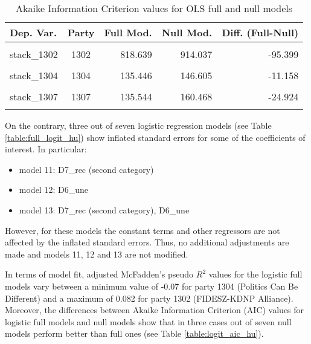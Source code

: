 \documentclass[
]{article}
\providecommand{\tightlist}{%
  \setlength{\itemsep}{0pt}\setlength{\parskip}{0pt}}
\begin{document}
\begin{table}[!h]

\caption{\label{tab:unnamed-chunk-85}Akaike Information Criterion values for OLS full and null models 
        \label{table:ols_aic_hu}}
\centering
\begin{tabular}[t]{lcrrr}
\toprule
Dep. Var. & Party & Full Mod. & Null Mod. & Diff. (Full-Null)\\
\midrule
\cellcolor{gray!6}{stack\_1301} & \cellcolor{gray!6}{1301} & \cellcolor{gray!6}{695.969} & \cellcolor{gray!6}{736.686} & \cellcolor{gray!6}{-40.717}\\
stack\_1302 & 1302 & 818.639 & 914.037 & -95.399\\
\cellcolor{gray!6}{stack\_1303} & \cellcolor{gray!6}{1303} & \cellcolor{gray!6}{462.137} & \cellcolor{gray!6}{543.950} & \cellcolor{gray!6}{-81.813}\\
stack\_1304 & 1304 & 135.446 & 146.605 & -11.158\\
\cellcolor{gray!6}{stack\_1306} & \cellcolor{gray!6}{1306} & \cellcolor{gray!6}{296.612} & \cellcolor{gray!6}{314.278} & \cellcolor{gray!6}{-17.666}\\
\addlinespace
stack\_1307 & 1307 & 135.544 & 160.468 & -24.924\\
\cellcolor{gray!6}{stack\_1308} & \cellcolor{gray!6}{1308} & \cellcolor{gray!6}{600.852} & \cellcolor{gray!6}{608.757} & \cellcolor{gray!6}{-7.905}\\
\bottomrule
\end{tabular}
\end{table}

On the contrary, three out of seven logistic regression models (see Table \ref{table:full_logit_hu}) show
inflated standard errors for some of the coefficients of interest. In particular:

\begin{itemize}
\tightlist
\item
  model 11: D7\_rec (second category)
\item
  model 12: D6\_une
\item
  model 13: D7\_rec (second category), D6\_une
\end{itemize}

However, for these models the constant terms and other regressors are not affected by the inflated standard errors. Thus, no additional adjustments are made and models 11, 12 and 13 are not modified.

In terms of model fit, adjusted McFadden's pseudo \(R^2\) values for the logistic full models vary between
a minimum value of
-0.07
for party 1304
(Politics Can Be Different)
and a maximum of
0.082
for party 1302
(FIDESZ-KDNP Alliance).
Moreover, the differences between Akaike Information Criterion (AIC) values for logistic full models and
null models show that in three cases out of seven null models perform better than full ones (see Table \ref{table:logit_aic_hu}).
\end{document}
